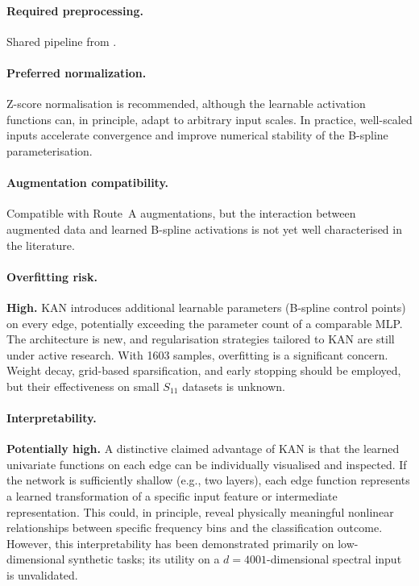 \paragraph{Required preprocessing.}
Shared pipeline from .

\paragraph{Preferred normalization.}
Z-score normalisation is recommended, although the learnable activation
functions can, in principle, adapt to arbitrary input scales.  In
practice, well-scaled inputs accelerate convergence and improve
numerical stability of the B-spline parameterisation.

\paragraph{Augmentation compatibility.}
Compatible with Route~A augmentations, but the interaction between
augmented data and learned B-spline activations is not yet well
characterised in the literature.

\paragraph{Overfitting risk.}
\textbf{High.}  KAN introduces additional learnable parameters
(B-spline control points) on every edge, potentially exceeding the
parameter count of a comparable MLP.  The architecture is new, and
regularisation strategies tailored to KAN are still under active
research.  With \num{1603} samples, overfitting is a significant
concern.  Weight decay, grid-based sparsification, and early stopping
should be employed, but their effectiveness on small $S_{11}$ datasets
is unknown.

\paragraph{Interpretability.}
\textbf{Potentially high.}  A distinctive claimed advantage of KAN is
that the learned univariate functions on each edge can be individually
visualised and inspected.  If the network is sufficiently shallow
(e.g., two layers), each edge function represents a learned
transformation of a specific input feature or intermediate
representation.  This could, in principle, reveal physically meaningful
nonlinear relationships between specific frequency bins and the
classification outcome.  However, this interpretability has been
demonstrated primarily on low-dimensional synthetic tasks; its utility
on a $d = 4001$-dimensional spectral input is unvalidated.

